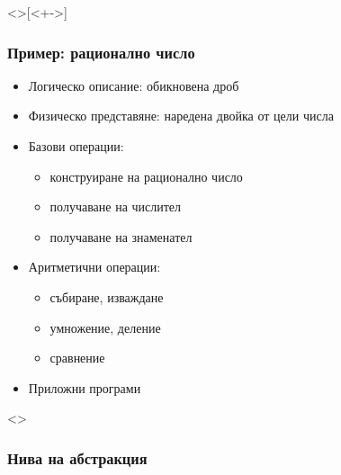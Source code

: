 \documentclass[alsotrans,beameroptions={aspectratio=169}]{beamerswitch}
\begin{document}
\begin{frame}<>[<+->]
  \frametitle{Пример: рационално число}

  \begin{itemize}
  \item Логическо описание: обикновена дроб
  \item Физическо представяне: наредена двойка от цели числа
  \item Базови операции:
    \begin{itemize}[<.->]
    \item конструиране на рационално число
    \item получаване на числител
    \item получаване на знаменател
    \end{itemize}
  \item Аритметични операции:
    \begin{itemize}[<.->]
    \item събиране, изваждане
    \item умножение, деление
    \item сравнение
    \end{itemize}
  \item Приложни програми
  \end{itemize}
\end{frame}

\begin{frame}<>
  \frametitle{Нива на абстракция}

  \begin{center}
  \end{center}
\end{frame}

\end{document}

